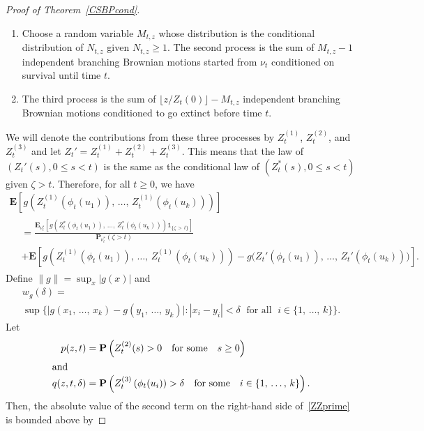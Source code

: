 \documentclass[AHL,Unicode,longabstracts,published]{cedram}
\newcommand*\E{\mathbf{E}}
\renewcommand*\P{\mathbf{P}}
\newcommand{\1} {\mathds{1}}
\begin{document}
\begin{proof}[Proof of Theorem~\ref{CSBPcond}]
\begin{enumerate}
\item Choose a random variable $M_{t,z}$ whose distribution is the conditional distribution of $N_{t,z}$ given $N_{t,z} \geq 1$. The second process is the sum of $M_{t,z} - 1$ independent branching Brownian motions started from $\nu_t$ conditioned on survival until time $t$.

\item The third process is the sum of $\lfloor z/Z_t(0) \rfloor - M_{t,z}$ independent branching Brownian motions conditioned to go extinct before time $t$.
\end{enumerate}
We will denote the contributions from these three processes by $Z_t^{(1)}$, $Z_t^{(2)}$, and $Z_t^{(3)}$ and let $Z_t' = Z_t^{(1)} + Z_t^{(2)} + Z_t^{(3)}$. This means that the law of $(Z_t'(s), 0 \leq s < t)$ is the same as the conditional law of $(Z_t^*(s), 0 \leq s < t)$ given $\zeta > t$. Therefore, for all $t \geq 0$, we have
\begin{multline}\label{ZZprime}
\E\left[g\left(Z_t^{(1)}\left(\phi_t(u_1)\right),\, \dots,\, Z_t^{(1)}\left(\phi_t(u_k)\right)\right)\right] \\
\begin{aligned}
&= \frac{\E_{\nu_t^*}\left[g\left(Z_t^*\left(\phi_t(u_1)\right),\, \dots,\, Z_t^*\left(\phi_t(u_k)\right)\right) \1_{\{\zeta\,>\,t\}}\right]}{\P_{\nu_t^*}(\zeta > t)}\\
&+ \E\left[g\left(Z_t^{(1)}\left(\phi_t(u_1)\right),\, \dots,\, Z_t^{(1)}\left(\phi_t(u_k)\right)\right) - g\big(Z_t'\left(\phi_t(u_1)\right),\, \dots,\, Z_t'\left(\phi_t(u_k)\right)\big)\right].
\end{aligned}
\end{multline}
Define $\|g\| = \sup_x |g(x)|$ and
\begin{multline*}
w_g(\delta)= \\
\sup\big\{\big|g\left(x_1,\, \dots,\, x_k\right) - g\left(y_1,\, \dots,\, y_k\right)\big|: \left|x_i - y_i\right| < \delta \;\text{ for all }\; i \in \{1, \,\dots,\,k\} \big\}.
\end{multline*}
Let
\begin{align*}
p(z,t) &= \P\left(Z_t^{(2)}(s) > 0\quad \text{for some}\quad s \geq 0\right)
\\
\intertext{and}
q(z,t,\delta) &= \P\left(Z_t^{(3)}\left(\phi_t(u_i)\right) > \delta \quad\text{for some}\quad i \in \{1,\, \dots,\, k\}\right).
\end{align*}
Then, the absolute value of the second term on the right-hand side of~\eqref{ZZprime} is bounded above by

\end{proof}
\end{document}
